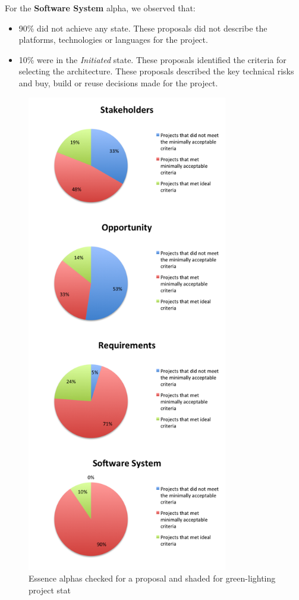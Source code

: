\documentclass[conference]{IEEEtran}
\begin{document}
For the \textbf{Software System} alpha, we observed that:
\begin{itemize}
\itemsep1pt\parskip0pt
\item
  90\% did not achieve any state. These proposals did not describe the
  platforms, technologies or languages for the project.
\item
  10\% were in the \textit{Initiated} state. These proposals identified the
  criteria for selecting the architecture. These proposals described the key technical risks and buy, build or reuse decisions made for the project.
\end{itemize}

\begin{figure}[!t]
\centering
\includegraphics[width=3.45in]{ProposalAlphasChartsStacked.png}
\caption{Essence alphas checked for a proposal and shaded for green-lighting project stat}
\label{ProposalChart}
\end{figure}
\end{document}
